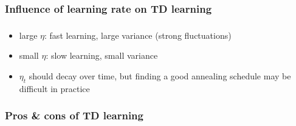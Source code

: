 \subsubsection{Influence of learning rate on TD learning}

\begin{frame}\frametitle{\subsubsecname}


	
\pause

	\begin{itemize}
		\item { large $\eta$: 
			fast learning, large variance (strong fluctuations)}
		\vspace{1mm}
		\item { small $\eta$: 
			slow learning, small variance}
		\vspace{1mm}
		\item { $\eta_t$ should decay over time, but finding a good annealing schedule may be difficult in practice}
	\end{itemize}

\end{frame}

\subsubsection{Pros \& cons of TD learning}

